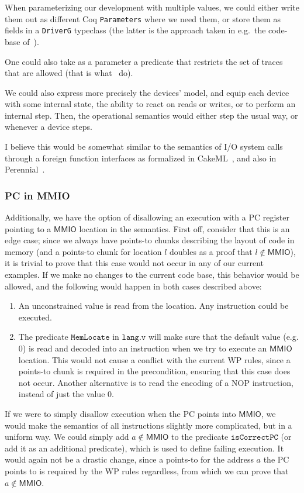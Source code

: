 \documentclass{article}
\newcommand{\X}[1]{\ensuremath{\mathrm{#1}}}
\newcommand{\I}[1]{\ensuremath{\mathtt{#1}}}
\newcommand{\Sf}[1]{\ensuremath{\mathsf{#1}}}
\newcommand{\MMIO}{\Sf{MMIO}\xspace}
\begin{document}
When parameterizing our development with multiple values, we could either write
them out as different Coq \texttt{Parameters} where we need them, or store them
as fields in a \texttt{DriverG} typeclass (the latter is the approach taken in
e.g.\ the code-base of~\cite{sammler-2020}).

One could also take as a parameter a predicate that restricts the set of traces
that are allowed (that is what~\cite{sammler-2020} do).

We could also express more precisely the devices' model, and equip each device
with some internal state, the ability to react on reads or writes, or to perform
an internal step. Then, the operational semantics would either step the usual
way, or whenever a device steps.

I believe this would be somewhat similar to the semantics of I/O system calls
through a foreign function interfaces as formalized in
CakeML~\cite{cakeml-vstte17io}, and also in Perennial~\cite{perennial-lang}.


\subsubsection{PC in MMIO}
\label{rk:opsem:pc_in_mmio}

Additionally, we have the option of disallowing an execution with a \X{PC}
register pointing to a $\MMIO$ location in the semantics.
%
First off, consider that this is an edge case; since we always have points-to
chunks describing the layout of code in memory (and a points-to chunk for
location $l$ doubles as a proof that $l \not\in \MMIO$), it is trivial to prove
that this case would not occur in any of our current examples.
%
If we make no changes to the current code base, this behavior would be allowed,
and the following would happen in both cases described above:
%
\begin{enumerate}
  \item An unconstrained value is read from the location. Any instruction could
    be executed.
%
  \item The predicate $\I{MemLocate}$ in $\I{lang.v}$ will make sure that the
    default value (e.g. $0$) is read and decoded into an instruction when we try
    to execute an \MMIO location. This would not cause a conflict with the
    current WP rules, since a points-to chunk is required in the precondition,
    ensuring that this case does not occur.
    Another alternative is to read the encoding of a $\X{NOP}$ instruction,
    instead of just the value $0$.
\end{enumerate}
%
If we were to simply disallow execution when the PC points into \MMIO, we would
make the semantics of all instructions slightly more complicated, but in a
uniform way.
%
We could simply add $a \not\in \MMIO$ to the predicate $\I{isCorrectPC}$ (or add
it as an additional predicate), which is used to define failing execution. It
would again not be a drastic change, since a points-to for the address $a$ the
PC points to is required by the WP rules regardless, from which we can prove
that $a \not\in \MMIO$.
\end{document}
